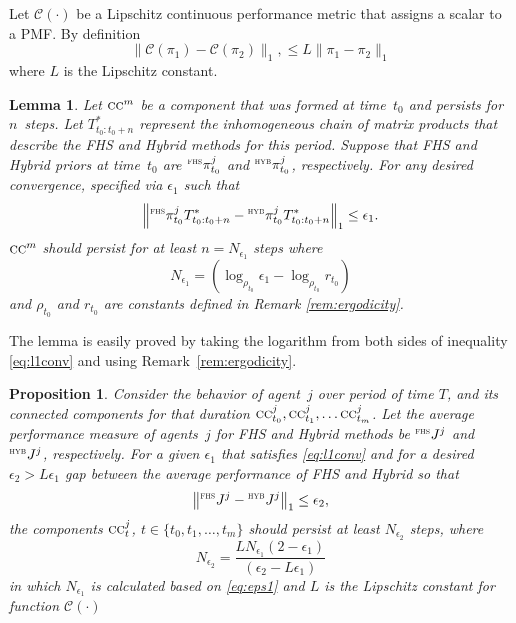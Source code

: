 \documentclass[journal]{IEEEtran}
\newtheorem{lemma}[theorem]{Lemma}
\newtheorem{prop}{Proposition}
\theoremstyle{remark}
\newcommand{\suf}[1]{\textsc{\tiny #1}}  %
\theoremstyle{definition}
\begin{document}
Let $\mathcal{C}(\cdot)$ be a Lipschitz continuous performance metric that assigns a scalar to a PMF. By definition
\begin{equation}
	\|\mathcal{C}(\pi_1)-\mathcal{C}(\pi_2)\|_1, \le L\|\pi_1-\pi_2\|_1
\end{equation} 
where $L$ is the Lipschitz constant. 

\begin{lemma}
\label{lem:l1conv}
Let $\textsc{cc}^m$ be a component that was formed at time~$t_0$ and persists for $n$~steps. Let  ${T}_{t_0:t_0 + n}^*$ represent the inhomogeneous chain of matrix
products that describe the FHS and Hybrid methods for this period. Suppose that FHS and Hybrid priors at time~$t_0$ are ${}^\suf{FHS}\pi^j_{t_0}$ and ${}^\suf{HYB}\pi^j_{t_0}$, respectively. 
For any desired convergence, specified via $\epsilon_1$ such that
	\begin{equation}
	\label{eq:l1conv}
	\left\| {}^\suf{FHS}\pi^j_{t_0} T^*_{t_0:t_0+n}  - {}^\suf{HYB}\pi^j_{t_0} T^*_{t_0:t_0+n} \right\|_1 \leq \epsilon_1.
	\end{equation}
	$\textsc{cc}^m$ should persist for at least $n = N_{\epsilon_1}$ steps where
	\begin{equation}
    \label{eq:eps1}
		N_{\epsilon_1}  = (\log_{\rho_{t_0}}\epsilon_1 - \log_{\rho_{t_0}}r_{t_0})
	\end{equation}
	and $\rho_{t_0}$ and $r_{t_0}$ are constants defined in Remark \ref{rem:ergodicity}.
\end{lemma}
The lemma is easily proved by taking the logarithm from both sides of inequality \eqref{eq:l1conv} and using Remark~\ref{rem:ergodicity}.

\begin{prop}
\label{prop:netperf}
Consider the behavior of agent~$j$ over period of time $T$, and its
connected components for that duration $\textsc{cc}^j_{t_0}, \textsc{cc}^j_{t_1}, \dots \textsc{cc}^j_{t_m}$.
Let the average performance measure of agents~$j$ for FHS and Hybrid methods be ${}^\suf{FHS}J^{j}$ and ${}^\suf{HYB}J^{j}$, respectively. For a given $\epsilon_1$  that satisfies \eqref{eq:l1conv} and for a desired $\epsilon_2>L\epsilon_1$ gap between the average performance of FHS and Hybrid so that 
\begin{equation}
\label{eq:prop1eq}
\left\|{}^\suf{FHS}J^{j} - {}^\suf{HYB}J^{j} \right\|_1 \le \epsilon_2,
\end{equation}
the components $\textsc{cc}^j_{t}$, $t \in \{t_0, t_1, \dots, t_m\}$ should persist at least $ N_{\epsilon_2}$ steps, where
\begin{equation}
\label{eq:neps2}
N_{\epsilon_2} = \frac{L N_{\epsilon_1}(2-\epsilon_1)}{(\epsilon_2 - L\epsilon_1)}
\end{equation}
in which $N_{\epsilon_1}$ is calculated based on \eqref{eq:eps1} and $L$ is the Lipschitz constant for function $\mathcal{C(\cdot)}$
\end{prop}
\end{document}
